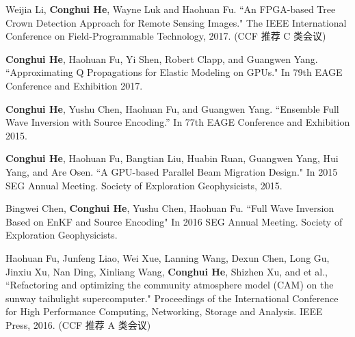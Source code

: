 \begin{resume}
\begin{publications}
   
  \end{publications}


  \begin{publications}
    \item Weijia Li, \textbf{Conghui He}, Wayne Luk and Haohuan Fu. ``An FPGA-based Tree Crown Detection Approach for Remote Sensing Images." The IEEE International Conference on Field-Programmable Technology, 2017. (CCF 推荐 C 类会议)

    \item \textbf{Conghui He}, Haohuan Fu, Yi Shen, Robert Clapp, and Guangwen Yang. ``Approximating Q Propagations for Elastic Modeling on GPUs." In 79th EAGE Conference and Exhibition 2017. 

    \item \textbf{Conghui He}, Yushu Chen, Haohuan Fu, and Guangwen Yang. ``Ensemble Full Wave Inversion with Source Encoding.'' In 77th EAGE Conference and Exhibition 2015.

    \item \textbf{Conghui He}, Haohuan Fu, Bangtian Liu, Huabin Ruan, Guangwen Yang, Hui Yang, and Are Osen. ``A GPU-based Parallel Beam Migration Design." In 2015 SEG Annual Meeting. Society of Exploration Geophysicists, 2015.

    \item Bingwei Chen, \textbf{Conghui He}, Yushu Chen, Haohuan Fu. ``Full Wave Inversion Based on EnKF and Source Encoding" In 2016 SEG Annual Meeting. Society of Exploration Geophysicists.

    \item Haohuan Fu, Junfeng Liao, Wei Xue, Lanning Wang, Dexun Chen, Long Gu, Jinxiu Xu, Nan Ding, Xinliang Wang, \textbf{Conghui He}, Shizhen Xu, and et al., ``Refactoring and optimizing the community atmosphere model (CAM) on the sunway taihulight supercomputer." Proceedings of the International Conference for High Performance Computing, Networking, Storage and Analysis. IEEE Press, 2016. (CCF 推荐 A 类会议)


\end{publications}
\end{resume}
